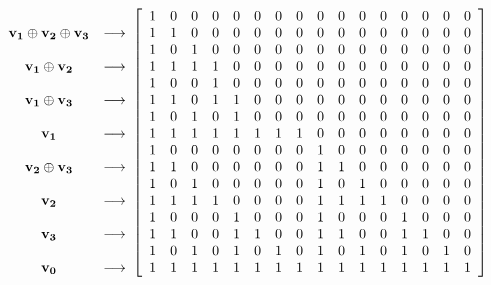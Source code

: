 \begin{equation}
{\begin{array}{ccc}
\\ \bf v_1 \oplus v_2 \oplus v_3 & \longrightarrow \\
\\ \bf v_1 \oplus v_2 & \longrightarrow \\
\\ \bf v_1 \oplus v_3 & \longrightarrow \\
\\ \bf v_1  & \longrightarrow \\
\\ \bf v_2 \oplus v_3 & \longrightarrow \\
\\ \bf v_2 & \longrightarrow \\
\\ \bf v_3 & \longrightarrow \\
\\ \bf v_0 & \longrightarrow \\
\end{array} 
} 
{\left[ \begin{array}{cccccccccccccccc}
1 & 0 & 0 & 0 & 0 & 0 & 0 & 0 & 0 & 0 & 0 & 0 & 0 & 0 & 0 & 0\\
1 & 1 & 0 & 0 & 0 & 0 & 0 & 0 & 0 & 0 & 0 & 0 & 0 & 0 & 0 & 0\\
1 & 0 & 1 & 0 & 0 & 0 & 0 & 0 & 0 & 0 & 0 & 0 & 0 & 0 & 0 & 0\\
1 & 1 & 1 & 1 & 0 & 0 & 0 & 0 & 0 & 0 & 0 & 0 & 0 & 0 & 0 & 0\\
1 & 0 & 0 & 1 & 0 & 0 & 0 & 0 & 0 & 0 & 0 & 0 & 0 & 0 & 0 & 0\\
1 & 1 & 0 & 1 & 1 & 0 & 0 & 0 & 0 & 0 & 0 & 0 & 0 & 0 & 0 & 0\\
1 & 0 & 1 & 0 & 1 & 0 & 0 & 0 & 0 & 0 & 0 & 0 & 0 & 0 & 0 & 0\\
1 & 1 & 1 & 1 & 1 & 1 & 1 & 1 & 0 & 0 & 0 & 0 & 0 & 0 & 0 & 0\\
1 & 0 & 0 & 0 & 0 & 0 & 0 & 0 & 1 & 0 & 0 & 0 & 0 & 0 & 0 & 0\\
1 & 1 & 0 & 0 & 0 & 0 & 0 & 0 & 1 & 1 & 0 & 0 & 0 & 0 & 0 & 0\\
1 & 0 & 1 & 0 & 0 & 0 & 0 & 0 & 1 & 0 & 1 & 0 & 0 & 0 & 0 & 0\\
1 & 1 & 1 & 1 & 0 & 0 & 0 & 0 & 1 & 1 & 1 & 1 & 0 & 0 & 0 & 0\\
1 & 0 & 0 & 0 & 1 & 0 & 0 & 0 & 1 & 0 & 0 & 0 & 1 & 0 & 0 & 0\\
1 & 1 & 0 & 0 & 1 & 1 & 0 & 0 & 1 & 1 & 0 & 0 & 1 & 1 & 0 & 0\\
1 & 0 & 1 & 0 & 1 & 0 & 1 & 0 & 1 & 0 & 1 & 0 & 1 & 0 & 1 & 0\\
1 & 1 & 1 & 1 & 1 & 1 & 1 & 1 & 1 & 1 & 1 & 1 & 1 & 1 & 1 & 1\\
\end{array}
\right ]}
\label{equ:section_polar_construction}
\end{equation}


